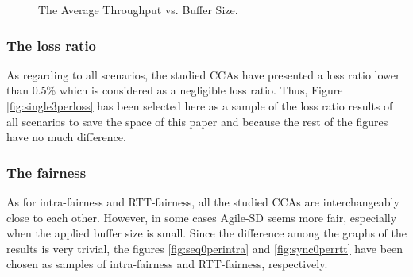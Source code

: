 \documentclass[preprint,3p,times,twocolumn,authoryear]{elsarticle}
\begin{document}
\begin{figure*}[t!]
	\begin{center}
	\end{center}
	\caption{The Average Throughput vs. Buffer Size.}
	\label{fig:throughput}
\end{figure*}

\subsubsection{The loss ratio}
As regarding to all scenarios, the studied CCAs have presented a loss ratio lower than 0.5\% which is considered as a negligible loss ratio. Thus, Figure \ref{fig:single3perloss} has been selected here as a sample of the loss ratio results of all scenarios to save the space of this paper and because the rest of the figures have no much difference.







\subsubsection{The fairness}
As for intra-fairness and RTT-fairness, all the studied CCAs are interchangeably close to each other. However, in some cases Agile-SD seems more fair, especially when the applied buffer size is small. Since the difference among the graphs of the results is very trivial, the figures \ref{fig:seq0perintra} and \ref{fig:sync0perrtt} have been chosen as samples of intra-fairness and RTT-fairness, respectively.
\end{document}
